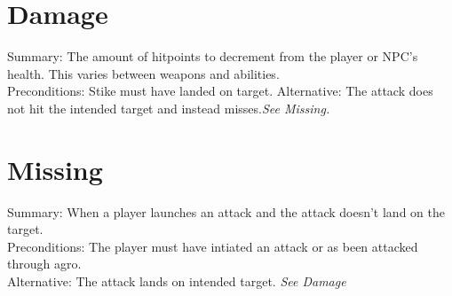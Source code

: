 \documentclass{report}
\begin{document}
    \section{Damage}
Summary: The amount of hitpoints to decrement from the player or NPC's health. This varies between weapons and abilities.\\
Preconditions: Stike must have landed on target.
Alternative: The attack does not hit the intended target and instead misses.\textit{See Missing.}
    \section{Missing}
    Summary: When a player launches an attack and the attack doesn't land on the target.\\
    
    Preconditions: The player must have intiated an attack or as been attacked through agro.\\
    Alternative: The attack lands on intended target. \textit{See Damage}
\end{document}
